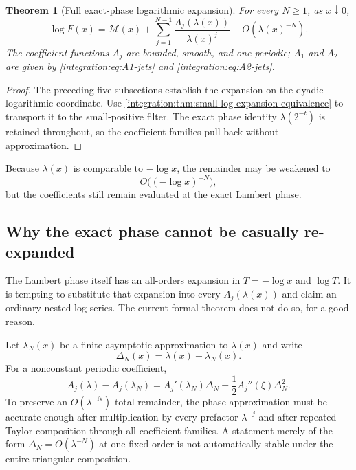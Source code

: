 \documentclass[11pt,oneside]{article}
\newtheorem{theorem}{Theorem}[section]
\theoremstyle{definition}
\theoremstyle{remark}
\begin{document}
\begin{theorem}[Full exact-phase logarithmic expansion]
\label{integration:thm:full-exact-phase-expansion}
For every $N\ge1$, as $x\downarrow0$,
\begin{equation}
 \boxed{
 \log F(x)=\mathcal M(x)+
 \sum_{j=1}^{N-1}\frac{A_j(\lambda(x))}{\lambda(x)^j}
 +O\!\left(\lambda(x)^{-N}\right).}
 \label{integration:eq:full-exact-phase-expansion}
\end{equation}
The coefficient functions $A_j$ are bounded, smooth, and one-periodic; $A_1$ and $A_2$ are
given by \eqref{integration:eq:A1-jets} and \eqref{integration:eq:A2-jets}.
\end{theorem}

\begin{proof}
The preceding five subsections establish the expansion on the dyadic logarithmic coordinate.
Use \cref{integration:thm:small-log-expansion-equivalence} to transport it to the small-positive filter.
The exact phase identity $\lambda(2^{-t})$ is retained throughout, so the coefficient
families pull back without approximation.
\end{proof}

Because $\lambda(x)$ is comparable to $-\log x$, the remainder may be weakened to
\begin{equation}
 O\bigl(({-\log x})^{-N}\bigr),
 \label{integration:eq:full-expansion-neglog-rate}
\end{equation}
but the coefficients still remain evaluated at the exact Lambert phase.

\subsection{Why the exact phase cannot be casually re-expanded}
\label{integration:sec:exact-phase-boundary}

The Lambert phase itself has an all-orders expansion in
$T=-\log x$ and $\log T$.  It is tempting to substitute that expansion into every
$A_j(\lambda(x))$ and claim an ordinary nested-log series.  The current formal theorem does
not do so, for a good reason.

Let $\lambda_N(x)$ be a finite asymptotic approximation to $\lambda(x)$ and write
\begin{equation}
 \Delta_N(x)=\lambda(x)-\lambda_N(x).
 \label{integration:eq:phase-error}
\end{equation}
For a nonconstant periodic coefficient,
\begin{equation}
 A_j(\lambda)-A_j(\lambda_N)
 =A_j'(\lambda_N)\Delta_N+\frac12 A_j''(\xi)\Delta_N^2.
 \label{integration:eq:periodic-phase-Taylor}
\end{equation}
To preserve an $O(\lambda^{-N})$ total remainder, the phase approximation must be accurate
enough after multiplication by every prefactor $\lambda^{-j}$ and after repeated Taylor
composition through all coefficient families.  A statement merely of the form
$\Delta_N=O(\lambda^{-N})$ at one fixed order is not automatically stable under the entire
triangular composition.
\end{document}
